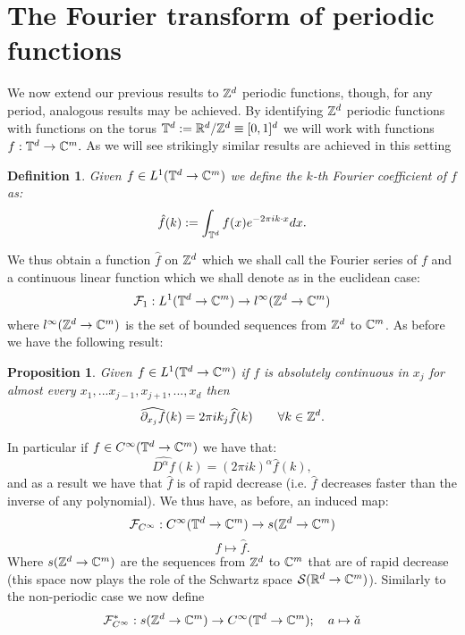 \documentclass[12pt]{article}
\newtheorem{proposition}{Proposition}
\newtheorem{definition}{Definition}
\begin{document}
\section{The Fourier transform of periodic functions}
We now extend our previous results to ${\mathbb Z}^d$ periodic functions, though, for any period, analogous results may be achieved. By identifying ${\mathbb Z}^d$ periodic functions with functions on the torus ${\mathbb T}^d:={\mathbb R}^d/{\mathbb Z}^d\equiv [0,1]^d$ we will work with functions $f:{\mathbb T}^d\to\mathbb{C}^m.$ As we will see strikingly similar results are achieved in this setting
\begin{definition}
	Given $f\in L^1({\mathbb T}^d\to\mathbb{C}^m)$ we define the \emph{$k$-th Fourier coefficient} of $f$ as:
	\[\hat{f}(k):=\int_{{\mathbb T}^d}f(x)e^{-2\pi ik\cdot x}dx.\]
\end{definition}
\noindent We thus obtain a function $\hat{f}$ on ${\mathbb Z}^d$  which we shall call the Fourier series of $f$ and a continuous linear function which we shall denote as in the euclidean case:
\[\mathcal{F}_1:L^1({\mathbb T}^d\to\mathbb{C}^m)\to l^\infty({\mathbb Z}^d\to\mathbb{C}^m)\]
where $l^{\infty}({\mathbb Z}^d\to\mathbb{C}^m)$ is the set of bounded sequences from ${\mathbb Z}^d$ to $\mathbb{C}^m$. As before we have the following result:
\begin{proposition}\label{regdecaypft}
	Given $f\in L^1({\mathbb T}^d\to\mathbb{C}^m)$ if $f$ is absolutely continuous in $x_j$ for almost every $x_1,...x_{j-1},x_{j+1},...,x_d$ then
	\[\widehat{\partial_{x_j}{f}}(k)=2\pi i k_j\widehat{f}(k)\qquad\forall k\in{\mathbb Z}^d.\]
\end{proposition}
In particular if $f\in C^\infty({\mathbb T}^d\to\mathbb{C}^m)$ we have that:
\begin{equation}\label{rgivesdpft}
	\widehat{D^\alpha f}(k)=(2\pi ik)^\alpha\hat{f}(k),
\end{equation}
and as a result we have that $\hat{f}$ is of rapid decrease (i.e. $\hat{f}$ decreases faster than the inverse of any polynomial). We thus have, as before, an induced map:
\[\mathcal{F}_{C^\infty}:C^\infty({\mathbb T}^d\to\mathbb{C}^m)\to s({\mathbb Z}^d\to\mathbb{C}^m)\]
\[f\mapsto \hat{f}.\]
Where $s({\mathbb Z}^d\to\mathbb{C}^m)$ are the sequences from ${\mathbb Z}^d$ to $\mathbb{C}^m$ that are of rapid decrease (this space now plays the role of the Schwartz space ${\mathcal S}({\mathbb R}^d\to\mathbb{C}^m)$).
\bigbreak
Similarly to the non-periodic case we now define
\[\mathcal{F}^*_{C^\infty}:s({\mathbb Z}^d\to\mathbb{C}^m)\to C^\infty({\mathbb T}^d\to\mathbb{C}^m);\quad a\mapsto\check{a}\]
\end{document}
